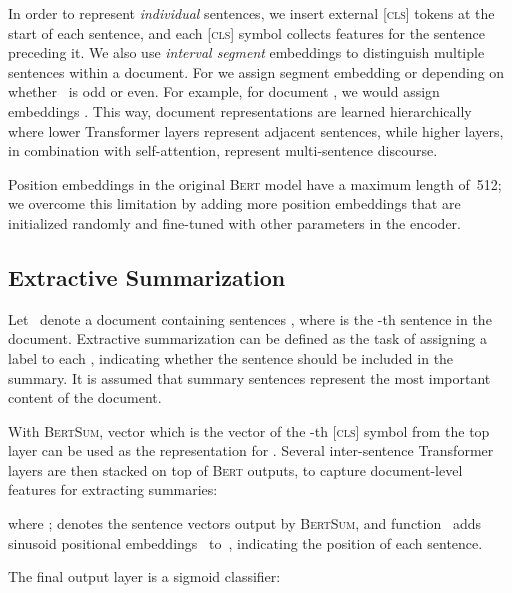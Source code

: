 \documentclass[11pt,a4paper]{article}
\begin{document}
    


    
    In order to represent \emph{individual} sentences, we insert
    external [\textsc{cls}] tokens at the start of each sentence, and
    each [\textsc{cls}] symbol collects features for the sentence
    preceding it. We also use \emph{interval segment} embeddings to
    distinguish multiple sentences within a document. For  we
    assign segment embedding  or  depending on whether~
    is odd or even. For example, for document , we would assign embeddings . This way, document representations are learned
    hierarchically where lower Transformer layers represent adjacent
    sentences, while higher layers, in combination with
    self-attention, represent multi-sentence discourse.
    
    
    
    Position embeddings in the original \textsc{Bert} model have a maximum
    length of~512; we overcome this limitation by adding more position
    embeddings that are initialized randomly and fine-tuned with other
    parameters in the encoder.
    
    
    
    
    
    \subsection{Extractive Summarization}
    \label{sec:extr-summ}
    
    Let ~denote a document containing sentences , where  is the -th sentence in the
    document.  Extractive summarization can be defined as the task of
    assigning a label  to each , indicating
    whether the sentence should be included in the summary. It is assumed
    that summary sentences represent the most important content of the
    document.
    
    With \textsc{BertSum}, vector  which is the vector of the -th
    [\textsc{cls}] symbol from the top layer can be used as the
    representation for .  Several inter-sentence Transformer
    layers are then stacked on top of \textsc{Bert} outputs, to capture
    document-level features for extracting summaries:
    
    where ;  denotes the sentence vectors
    output by \textsc{BertSum}, and function~ adds
    sinusoid positional embeddings~\cite{vaswani2017attention} to~,
    indicating the position of each sentence.
    
    The final output layer is a sigmoid classifier:
    
\end{document}
